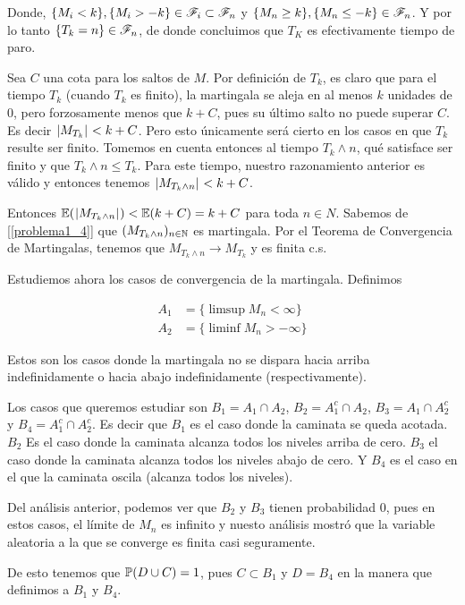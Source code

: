 Donde, $\{ M_i < k \}, \{ M_i > -k \} \in \mathscr{F}_i \subset \mathscr{F}_n$ y $\{ M_n \geq k \}, \{ M_n \leq -k \} \in \mathscr{F}_n$. 
Y por lo tanto $\{ T_k = n\} \in \mathscr{F}_n$, de donde concluimos que $T_K$ es efectivamente tiempo de paro.\pn


Sea $C$ una cota para los saltos de $M$. Por definición de $T_k$, es claro que para el tiempo $T_k$ (cuando $T_k$ es finito), 
la martingala se aleja en al menos $k$ unidades de 0, pero forzosamente menos que $k + C$, pues su último salto no 
puede superar $C$. Es decir $\hspace{.25mm}\left|M_{T_k}\right|\hspace{.25mm} < k + C$. Pero esto únicamente será cierto en los casos en que $T_k$ resulte 
ser finito. Tomemos en cuenta entonces al tiempo $T_k \wedge n$, qué satisface ser finito y que $T_k \wedge n \leq T_k$. 
Para este tiempo, nuestro razonamiento anterior es válido y entonces tenemos $\hspace{.25mm}\left|M_{T_k \wedge n}\right|\hspace{.25mm} < k + C$.\pn

Entonces $\mathbb{E}(\hspace{.25mm}\left|M_{T_k \wedge n}\right|\hspace{.25mm}) < \mathbb{E}(k + C) = k + C$ para toda $n \in N$. Sabemos de [\ref{problema1_4}] que 
$(M_{T_k \wedge n})_{n \in \mathbb{N}}$ es martingala. Por el Teorema de Convergencia de Martingalas, tenemos que 
$M_{T_k \wedge n} \longrightarrow M_{T_k}$ y es finita c.s.\pn

Estudiemos ahora los casos de convergencia de la martingala. Definimos

\begin{align}
        A_1     &=  \{ \limsup M_n < \infty     \}    \\
        A_2     &=  \{ \liminf M_n > -\infty    \}
\end{align}

Estos son los casos donde la martingala no se dispara hacia arriba indefinidamente o hacia abajo indefinidamente
(respectivamente).\pn

Los casos que queremos estudiar son $B_1 = A_1 \cap A_2$, $B_2 = A_1^c \cap A_2$, $B_3 = A_1 \cap A_2^c$ y 
$B_4 = A_1^c \cap A_2^c$. Es decir que $B_1$ es el caso donde la caminata se queda acotada. $B_2$ Es el caso 
donde la caminata alcanza todos los niveles arriba de cero. $B_3$ el caso donde la caminata alcanza todos 
los niveles abajo de cero. Y $B_4$ es el caso en el que la caminata oscila (alcanza todos los niveles).\pn

Del análisis anterior, podemos ver que $B_2$ y $B_3$ tienen probabilidad 0, pues en estos casos, el límite de
$M_n$ es infinito y nuesto análisis mostró que la variable aleatoria a la que se converge es finita casi seguramente.\pn

De esto tenemos que $\mathbb{P}(D \cup C) = 1$, pues $C \subset B_1$ y $D = B_4$ en la manera que definimos a $B_1$ y $B_4$.\pn

